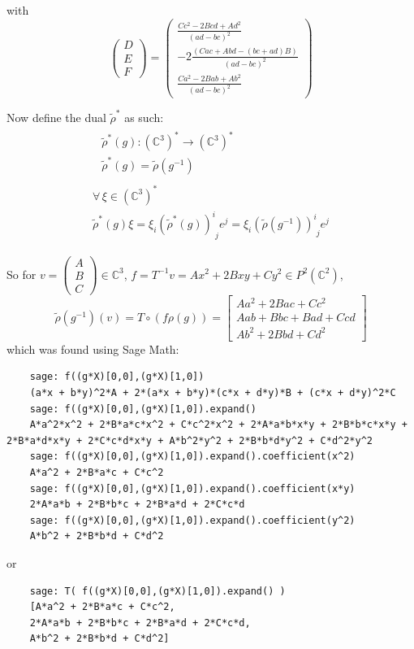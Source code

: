 \begin{enumerate}
	with
	\[
	\left( \begin{matrix} D \\ E \\ F \end{matrix} \right) = \left( \begin{matrix} \frac{ Cc^2 - 2Bcd + Ad^2}{(ad-bc)^2} \\ 
	- 2 \frac{ (Cac + Abd - (bc+ad) B)}{(ad-bc)^2} \\
	\frac{ Ca^2 - 2Bab + Ab^2 }{(ad-bc)^2 } \end{matrix} \right)
	\]
	
	Now define the dual $\widetilde{\rho}^*$ as such:
	\[
	\begin{gathered}
	\begin{aligned}
	& \widetilde{\rho}^*(g): (\mathbb{C}^3)^* \to (\mathbb{C}^3)^* \\ 
	&  \widetilde{\rho}^*(g) = \widetilde{\rho}(g^{-1}) 
	\end{aligned}  \\
	\begin{gathered}
	\forall \, \xi \in (\mathbb{C}^3)^* \\ 
	\widetilde{\rho}^*(g)\xi = \xi_i (\widetilde{\rho}^*(g))^i_{ \,\, j} e^j = \xi_i (\widetilde{\rho}(g^{-1}))^i_{ \,\, j} e^j
	\end{gathered}
	\end{gathered}
	\]
	
	So for $v = \left( \begin{matrix} A \\ B \\ C \end{matrix} \right) \in \mathbb{C}^3$, $f = T^{-1}v = Ax^2 + 2Bxy + Cy^2 \in P^2(\mathbb{C}^2)$, 
	\[
	\widetilde{\rho}(g^{-1})(v) = T \circ ( f \rho(g) ) = \left[ \begin{matrix} Aa^2 + 2Bac + Cc^2 \\
	Aab + Bbc + Bad + Ccd \\
	Ab^2 + 2Bbd + Cd^2 \end{matrix} \right]
	\]
	which was found using Sage Math:
	\begin{lstlisting}
	sage: f((g*X)[0,0],(g*X)[1,0])
	(a*x + b*y)^2*A + 2*(a*x + b*y)*(c*x + d*y)*B + (c*x + d*y)^2*C
	sage: f((g*X)[0,0],(g*X)[1,0]).expand()
	A*a^2*x^2 + 2*B*a*c*x^2 + C*c^2*x^2 + 2*A*a*b*x*y + 2*B*b*c*x*y + 2*B*a*d*x*y + 2*C*c*d*x*y + A*b^2*y^2 + 2*B*b*d*y^2 + C*d^2*y^2
	sage: f((g*X)[0,0],(g*X)[1,0]).expand().coefficient(x^2)
	A*a^2 + 2*B*a*c + C*c^2
	sage: f((g*X)[0,0],(g*X)[1,0]).expand().coefficient(x*y)
	2*A*a*b + 2*B*b*c + 2*B*a*d + 2*C*c*d
	sage: f((g*X)[0,0],(g*X)[1,0]).expand().coefficient(y^2)
	A*b^2 + 2*B*b*d + C*d^2
	\end{lstlisting}
	or 
	\begin{lstlisting}
	sage: T( f((g*X)[0,0],(g*X)[1,0]).expand() )
	[A*a^2 + 2*B*a*c + C*c^2,
	2*A*a*b + 2*B*b*c + 2*B*a*d + 2*C*c*d,
	A*b^2 + 2*B*b*d + C*d^2]
	\end{lstlisting}
	

\end{enumerate}

